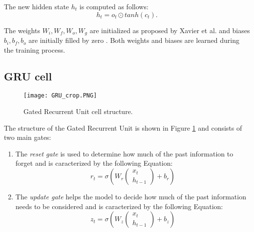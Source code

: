 The new hidden state $h_t$ is computed as follows:
\begin{equation}
    h_t = o_t \odot tanh(c_t) .
\end{equation}

The weights $W_i, W_f, W_o, W_g$ are initialized as proposed by Xavier et al. 
\cite{Xavier} and biases $b_i, b_f, b_o$ are initially filled by zero \cite{init}.
Both weights and biases are learned during the training process.





\subsection{GRU cell}

\begin{figure}[hb]
\centerline{\texttt{[image: GRU\_crop.PNG]}}
\caption{Gated Recurrent Unit cell structure.} %
\label{fig:gru}
\end{figure}

The structure of the Gated Recurrent Unit is shown in Figure \ref{fig:gru} 
and consists of two main gates:

\begin{enumerate}
    \item The \textit{reset gate} is used to determine how much of the past 
    information to forget and is caracterized by the following Equation:
        \begin{equation}
            r_t = \sigma \left(
                W_r
                \begin{pmatrix}
                x_t \\
                h_{t-1}
                \end{pmatrix}
                + b_r
            \right)
        \end{equation}
    
    \item The \textit{update gate} helps the model to decide how much of the past 
    information needs to be considered and is caracterized by the following Equation:
        \begin{equation}
            z_t = \sigma \left(
                W_z
                \begin{pmatrix}
                x_t \\
                h_{t-1}
                \end{pmatrix}
                + b_z
            \right)
        \end{equation}

\end{enumerate}

